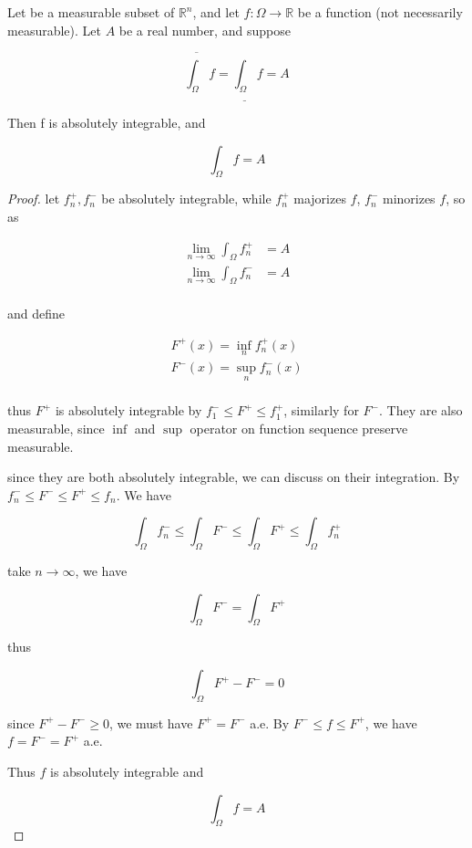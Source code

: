 \begin{thm}
    Let be a measurable subset of $\mathbb{R}^n$, and let $f: \Omega \to \mathbb{R}$ 
    be a function  (not necessarily measurable). Let $A$ be a real number, and suppose

    \[
        \overline{\int_{\Omega}}f =\underline{\int_{\Omega}}f = A
    \]
    
    Then f is absolutely integrable, and 

    \[
        \int_{\Omega}f  = A
    \]
\end{thm}

\begin{proof}
    let $f^+_n, f^-_n$ be absolutely integrable, while $f_n^+$ majorizes $f$, $f^-_n$ minorizes $f$, so as

    \begin{align*}
        \lim_{n \to \infty}\int_{\Omega} f^+_n &= A  \\
        \lim_{n \to \infty}\int_{\Omega} f^-_n &= A  \\
    \end{align*}

    and define

    \begin{align*}
        F^+(x) = \inf_{n} f^+_n(x) \\
        F^-(x) = \sup_{n} f^-_n(x) \\
    \end{align*}

    thus $F^+$ is absolutely integrable by $f^-_1 \le F^+ \le f^+_1$, similarly for $F^-$. They are
    also measurable, since $\inf$ and $\sup$ operator on function sequence preserve measurable.

    since they are both absolutely integrable, we can discuss on their integration. By $f^-_n \le F^- \le F^+ \le f_n$. We have

    \[
  \int_{\Omega}f^-_n \le \int_{\Omega} F^- \le \int_{\Omega}F^+ \le \int_{\Omega}f^+_n
    \]

    take $n \to \infty$, we have

    \[
\int_{\Omega} F^- = \int_{\Omega}F^+
    \]

    thus 

    \[
        \int_{\Omega}F^+ - F^- = 0
    \]

    since $F^+ - F^- \ge 0$, we must have $F^+ = F^-$ a.e. By $F^- \le f \le F^+$, we have $f = F^- = F^+$ a.e.

    Thus $f$ is absolutely integrable and

    \[
        \int_{\Omega}f = A
    \]
\end{proof}



